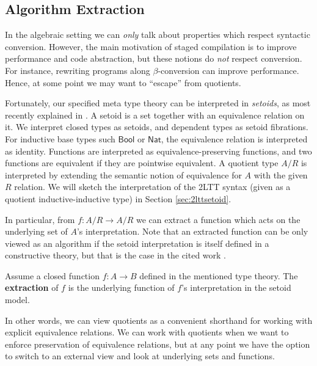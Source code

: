 \documentclass[acmsmall,screen]{acmart}
\newcommand{\msf}[1]{\mathsf{#1}}
\newcommand{\Bool}{\msf{Bool}}
\newcommand{\Nat}{\msf{Nat}}
\theoremstyle{remark}
\begin{document}
\subsection{Algorithm Extraction}

In the algebraic setting we can \emph{only} talk about properties which
respect syntactic conversion. However, the main motivation of staged compilation is to
improve performance and code abstraction, but these notions do \emph{not}
respect conversion. For instance, rewriting programs along $\beta$-conversion
can improve performance. Hence, at some point we may want to ``escape'' from
quotients.

Fortunately, our specified meta type theory can be interpreted in
\emph{setoids}, as most recently explained in
\cite{DBLP:journals/pacmpl/PujetT22}. A setoid is a set together with an
equivalence relation on it. We interpret closed types as setoids, and dependent
types as setoid fibrations. For inductive base types such $\Bool$ or $\Nat$, the
equivalence relation is interpreted as identity. Functions are interpreted as
equivalence-preserving functions, and two functions are equivalent if they are
pointwise equivalent. A quotient type $A/R$ is interpreted by extending the
semantic notion of equivalence for $A$ with the given $R$ relation. We will
sketch the interpretation of the 2LTT syntax (given as a quotient
inductive-inductive type) in Section \ref{sec:2lttsetoid}.

In particular, from $f : A/R \to A/R$ we can extract a function which acts on
the underlying set of $A$'s interpretation. Note that an extracted function can
be only viewed as an algorithm if the setoid interpretation is itself defined in
a constructive theory, but that is the case in the cited work
\cite{DBLP:journals/pacmpl/PujetT22}.

\begin{definition} Assume a closed function $f : A \to B$ defined
in the mentioned type theory. The \textbf{extraction} of $f$ is
the underlying function of $f$'s interpretation in the setoid model.
\end{definition}

In other words, we can view quotients as a convenient shorthand for working with
explicit equivalence relations. We can work with quotients when we want to enforce
preservation of equivalence relations, but at any point we have the option to
switch to an external view and look at underlying sets and functions.

\end{document}
